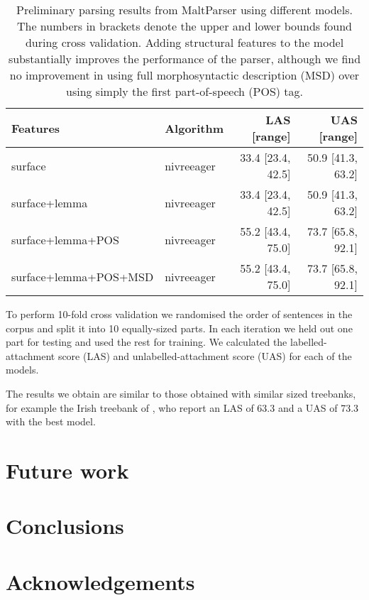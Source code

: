 \documentclass[a4paper,11pt, onecolumn,twoside]{article}
\begin{document}

\begin{table}[htbp]
	\caption{Preliminary parsing results from MaltParser using different models. The numbers in brackets denote the upper and lower bounds found during cross validation. Adding structural features to the model substantially improves the performance of the parser, although we find no improvement in using full morphosyntactic description (MSD) over using simply the first part-of-speech (POS) tag.}
	\centering
	\begin{tabular}{llrr}
		\toprule
			\textbf{Features}       & \textbf{Algorithm} &\textbf{LAS} [range] & \textbf{UAS} [range] \\
		\midrule
			surface                & nivreeager  & 33.4 [23.4, 42.5] & 50.9 [41.3, 63.2] \\
			surface+lemma          & nivreeager  & 33.4 [23.4, 42.5] & 50.9 [41.3, 63.2] \\
			surface+lemma+POS      & nivreeager  & 55.2 [43.4, 75.0] & 73.7 [65.8, 92.1] \\
			surface+lemma+POS+MSD  & nivreeager  & 55.2 [43.4, 75.0] & 73.7 [65.8, 92.1] \\
		\bottomrule
	\end{tabular}
	\label{table:eval}
\end{table}

To perform 10-fold cross validation we randomised the order of sentences in the corpus
and split it into 10 equally-sized parts. In each iteration we held out one part for testing and used
the rest for training. We calculated the labelled-attachment score (LAS) and 
unlabelled-attachment score (UAS) for each of the models.

The results we obtain are similar to those obtained with similar 
sized treebanks, for example the Irish treebank of \textcite{Lynn12}, who report an LAS of
63.3 and a UAS of 73.3 with the best model.


\section{Future work}\label{sec:future}




\section{Conclusions}\label{sec:conclusions}

\section*{Acknowledgements}


%
%
\begin{small}
\printbibliography
\end{small}
\end{document}
